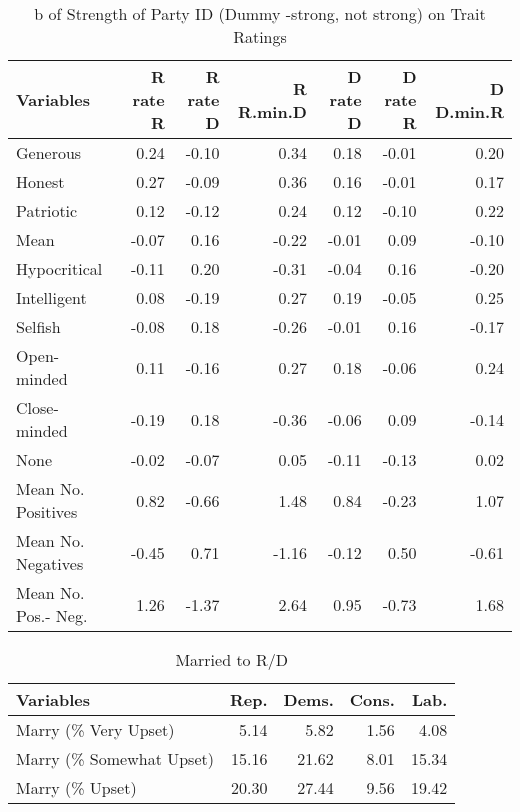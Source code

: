 \documentclass[a4paper]{article}
\begin{document}
\begin{table}[ht]
\begin{center}
\caption{b of Strength of Party ID (Dummy -strong, not strong) on Trait Ratings}
\label{tab:one3}
\begin{tabular}{lrrrrrr}
  \hline
Variables & R rate R & R rate D & R R.min.D & D rate D & D rate R & D D.min.R \\ 
  \hline
Generous & 0.24 & -0.10 & 0.34 & 0.18 & -0.01 & 0.20 \\ 
  Honest & 0.27 & -0.09 & 0.36 & 0.16 & -0.01 & 0.17 \\ 
  Patriotic & 0.12 & -0.12 & 0.24 & 0.12 & -0.10 & 0.22 \\ 
  Mean & -0.07 & 0.16 & -0.22 & -0.01 & 0.09 & -0.10 \\ 
  Hypocritical & -0.11 & 0.20 & -0.31 & -0.04 & 0.16 & -0.20 \\ 
  Intelligent & 0.08 & -0.19 & 0.27 & 0.19 & -0.05 & 0.25 \\ 
  Selfish & -0.08 & 0.18 & -0.26 & -0.01 & 0.16 & -0.17 \\ 
  Open-minded & 0.11 & -0.16 & 0.27 & 0.18 & -0.06 & 0.24 \\ 
  Close-minded & -0.19 & 0.18 & -0.36 & -0.06 & 0.09 & -0.14 \\ 
  None & -0.02 & -0.07 & 0.05 & -0.11 & -0.13 & 0.02 \\ 
  Mean No. Positives & 0.82 & -0.66 & 1.48 & 0.84 & -0.23 & 1.07 \\ 
  Mean No. Negatives & -0.45 & 0.71 & -1.16 & -0.12 & 0.50 & -0.61 \\ 
  Mean No. Pos.- Neg. & 1.26 & -1.37 & 2.64 & 0.95 & -0.73 & 1.68 \\ 
   \hline
\end{tabular}
\end{center}
\end{table}\clearpage
\begin{table}[ht]
\begin{center}
\caption{Married to R/D}
\label{tab:one}
\begin{tabular}{lrrrr}
  \hline
Variables & Rep. & Dems. & Cons. & Lab. \\ 
  \hline
Marry (\% Very Upset) & 5.14 & 5.82 & 1.56 & 4.08 \\ 
  Marry (\% Somewhat Upset) & 15.16 & 21.62 & 8.01 & 15.34 \\ 
  Marry (\% Upset) & 20.30 & 27.44 & 9.56 & 19.42 \\ 
   \hline
\end{tabular}
\end{center}
\end{table}%
\end{document}
